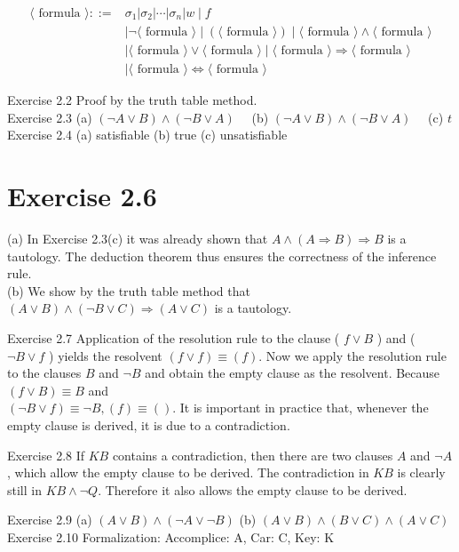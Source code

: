 \documentclass[10pt]{article}
\begin{document}
$$
\begin{aligned}
\langle\text { formula }\rangle::= & \sigma_{1}\left|\sigma_{2}\right| \cdots\left|\sigma_{n}\right| w \mid f \\
& \mid \neg\langle\text { formula }\rangle \mid(\langle\text { formula }\rangle) \mid\langle\text { formula }\rangle \wedge\langle\text { formula }\rangle \\
& \mid\langle\text { formula }\rangle \vee\langle\text { formula }\rangle \mid\langle\text { formula }\rangle \Rightarrow\langle\text { formula }\rangle \\
& \mid\langle\text { formula }\rangle \Leftrightarrow\langle\text { formula }\rangle
\end{aligned}
$$

Exercise 2.2 Proof by the truth table method.\\
Exercise 2.3 (a) $(\neg A \vee B) \wedge(\neg B \vee A) \quad$ (b) $(\neg A \vee B) \wedge(\neg B \vee A) \quad$ (c) $t$\\
Exercise 2.4 (a) satisfiable (b) true (c) unsatisfiable

\section*{Exercise 2.6}
(a) In Exercise 2.3(c) it was already shown that $A \wedge(A \Rightarrow B) \Rightarrow B$ is a tautology. The deduction theorem thus ensures the correctness of the inference rule.\\
(b) We show by the truth table method that $(A \vee B) \wedge(\neg B \vee C) \Rightarrow(A \vee C)$ is a tautology.

Exercise 2.7 Application of the resolution rule to the clause ( $f \vee B$ ) and ( $\neg B \vee f$ ) yields the resolvent $(f \vee f) \equiv(f)$. Now we apply the resolution rule to the clauses $B$ and $\neg B$ and obtain the empty clause as the resolvent. Because $(f \vee B) \equiv B$ and\\
$(\neg B \vee f) \equiv \neg B,(f) \equiv()$. It is important in practice that, whenever the empty clause is derived, it is due to a contradiction.

Exercise 2.8 If $K B$ contains a contradiction, then there are two clauses $A$ and $\neg A$, which allow the empty clause to be derived. The contradiction in $K B$ is clearly still in $K B \wedge \neg Q$. Therefore it also allows the empty clause to be derived.

Exercise 2.9 (a) $(A \vee B) \wedge(\neg A \vee \neg B)$ (b) $(A \vee B) \wedge(B \vee C) \wedge(A \vee C)$\\
Exercise 2.10 Formalization: Accomplice: A, Car: C, Key: K
\end{document}
